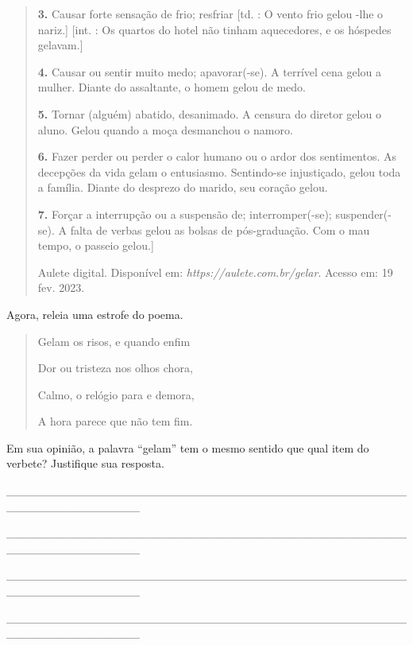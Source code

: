 \begin{boxlist}
{{\begin{quote}
\textbf{3.} Causar forte sensação de frio; resfriar [td. : O vento frio gelou -lhe o nariz.] [int. : Os quartos do hotel não tinham aquecedores, e os hóspedes gelavam.]

\textbf{4.} Causar ou sentir muito medo; apavorar(-se).
A terrível cena gelou a mulher.
Diante do assaltante, o homem gelou de medo.

\textbf{5.} Tornar (alguém) abatido, desanimado.
A censura do diretor gelou o aluno.
Gelou quando a moça desmanchou o namoro.

\textbf{6.} Fazer perder ou perder o calor humano ou o ardor dos sentimentos.
As decepções da vida gelam o entusiasmo.
Sentindo-se injustiçado, gelou toda a família.
Diante do desprezo do marido, seu coração gelou.

\textbf{7.} Forçar a interrupção ou a suspensão de; interromper(-se); suspender(-se).
A falta de verbas gelou as bolsas de pós-graduação.
Com o mau tempo, o passeio gelou.]

\fonte Aulete digital. Disponível em: \emph{https://aulete.com.br/gelar}. Acesso em: 19 fev. 2023.
\end{quote}

Agora, releia uma estrofe do poema.

\begin{quote}
Gelam os risos, e quando enfim

Dor ou tristeza nos olhos chora,

Calmo, o relógio para e demora,

A hora parece que não tem fim.
\end{quote}

Em sua opinião, a palavra ``gelam'' tem o mesmo sentido que qual item do verbete? Justifique sua resposta.


\_\_\_\_\_\_\_\_\_\_\_\_\_\_\_\_\_\_\_\_\_\_\_\_\_\_\_\_\_\_\_\_\_\_\_\_\_\_\_\_\_\_\_\_\_\_\_\_\_\_\_\_\_\_\_\_\_\_\_\_\_\_\_\_

\_\_\_\_\_\_\_\_\_\_\_\_\_\_\_\_\_\_\_\_\_\_\_\_\_\_\_\_\_\_\_\_\_\_\_\_\_\_\_\_\_\_\_\_\_\_\_\_\_\_\_\_\_\_\_\_\_\_\_\_\_\_\_\_

\_\_\_\_\_\_\_\_\_\_\_\_\_\_\_\_\_\_\_\_\_\_\_\_\_\_\_\_\_\_\_\_\_\_\_\_\_\_\_\_\_\_\_\_\_\_\_\_\_\_\_\_\_\_\_\_\_\_\_\_\_\_\_\_

\_\_\_\_\_\_\_\_\_\_\_\_\_\_\_\_\_\_\_\_\_\_\_\_\_\_\_\_\_\_\_\_\_\_\_\_\_\_\_\_\_\_\_\_\_\_\_\_\_\_\_\_\_\_\_\_\_\_\_\_\_\_\_\_

}}
\end{boxlist}

